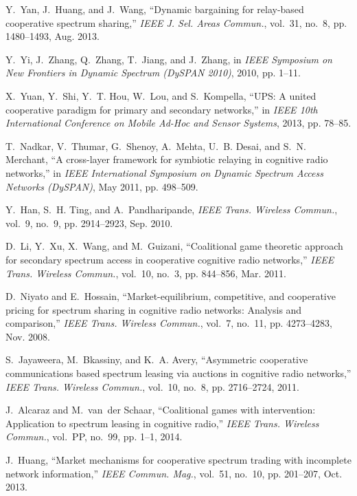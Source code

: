 \begin{thebibliography}{}
Y.~Yan, J.~Huang, and J.~Wang, ``Dynamic bargaining for relay-based cooperative
  spectrum sharing,'' \emph{{IEEE} J. Sel. Areas Commun.}, vol.~31, no.~8, pp.
  1480--1493, Aug. 2013.

Y.~Yi, J.~Zhang, Q.~Zhang, T.~Jiang, and J.~Zhang, in \emph{{IEEE} Symposium on
  New Frontiers in Dynamic Spectrum {(DySPAN 2010)}}, 2010, pp. 1--11.

X.~Yuan, Y.~Shi, Y.~T. Hou, W.~Lou, and S.~Kompella, ``{UPS}: A united
  cooperative paradigm for primary and secondary networks,'' in \emph{{IEEE}
  10th International Conference on Mobile Ad-Hoc and Sensor Systems}, 2013, pp.
  78--85.

T.~Nadkar, V.~Thumar, G.~Shenoy, A.~Mehta, U.~B. Desai, and S.~N. Merchant, ``A
  cross-layer framework for symbiotic relaying in cognitive radio networks,''
  in \emph{{IEEE} International Symposium on Dynamic Spectrum Access Networks
  (DySPAN)}, May 2011, pp. 498--509.

Y.~Han, S.~H. Ting, and A.~Pandharipande, \emph{{IEEE} Trans. Wireless
  Commun.}, vol.~9, no.~9, pp. 2914--2923, Sep. 2010.

D.~Li, Y.~Xu, X.~Wang, and M.~Guizani, ``Coalitional game theoretic approach
  for secondary spectrum access in cooperative cognitive radio networks,''
  \emph{{IEEE} Trans. Wireless Commun.}, vol.~10, no.~3, pp. 844--856, Mar.
  2011.

D.~Niyato and E.~Hossain, ``Market-equilibrium, competitive, and cooperative
  pricing for spectrum sharing in cognitive radio networks: Analysis and
  comparison,'' \emph{{IEEE} Trans. Wireless Commun.}, vol.~7, no.~11, pp.
  4273--4283, Nov. 2008.

S.~Jayaweera, M.~Bkassiny, and K.~A. Avery, ``Asymmetric cooperative
  communications based spectrum leasing via auctions in cognitive radio
  networks,'' \emph{{IEEE} Trans. Wireless Commun.}, vol.~10, no.~8, pp.
  2716--2724, 2011.

J.~Alcaraz and M.~van~der Schaar, ``Coalitional games with intervention:
  Application to spectrum leasing in cognitive radio,'' \emph{{IEEE} Trans.
  Wireless Commun.}, vol.~PP, no.~99, pp. 1--1, 2014.

J.~Huang, ``Market mechanisms for cooperative spectrum trading with incomplete
  network information,'' \emph{{IEEE} Commun. Mag.}, vol.~51, no.~10, pp.
  201--207, Oct. 2013.


\end{thebibliography}
